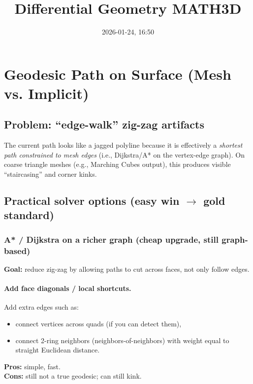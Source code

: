 \documentclass[12pt,a4paper]{article}
\title{Differential Geometry MATH3D}
\author{}
\date{2026-01-24, 16:50}
\theoremstyle{plain}
\theoremstyle{definition}
\begin{document}
	\maketitle
	
	\section{Geodesic Path on Surface (Mesh vs. Implicit)}
	
	\subsection{Problem: ``edge-walk'' zig-zag artifacts}
	The current path looks like a jagged polyline because it is effectively a \emph{shortest path constrained to mesh edges}
	(i.e., Dijkstra/A* on the vertex-edge graph). On coarse triangle meshes (e.g., Marching Cubes output), this produces
	visible ``staircasing'' and corner kinks.
	
	\subsection{Practical solver options (easy win $\rightarrow$ gold standard)}
	
		\subsubsection*{A* / Dijkstra on a richer graph (cheap upgrade, still graph-based)}
	\textbf{Goal:} reduce zig-zag by allowing paths to cut across faces, not only follow edges.
	
	\paragraph{Add face diagonals / local shortcuts.}
	Add extra edges such as:
	\begin{itemize}
		\item connect vertices across quads (if you can detect them),
		\item connect 2-ring neighbors (neighbors-of-neighbors) with weight equal to straight Euclidean distance.
	\end{itemize}
	\textbf{Pros:} simple, fast. \\
	\textbf{Cons:} still not a true geodesic; can still kink.
	
\end{document}
